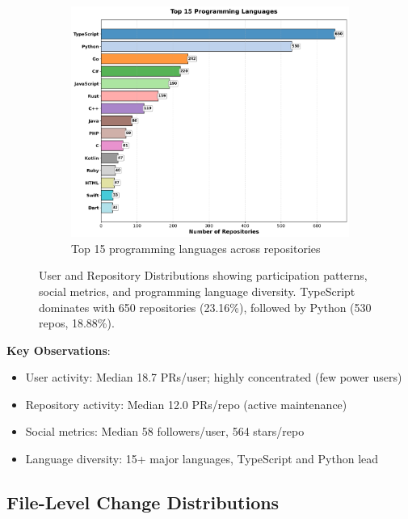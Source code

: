 \documentclass[11pt]{article}
\begin{document}
\begin{figure}[H]
\begin{subfigure}[b]{0.9\textwidth}
\centering
\includegraphics[width=\textwidth]{figures_individual/24_programming_languages_barplot.png}
\caption{Top 15 programming languages across repositories}
\label{fig:languages}
\end{subfigure}

\caption{User and Repository Distributions showing participation patterns, social metrics, and programming language diversity. TypeScript dominates with 650 repositories (23.16\%), followed by Python (530 repos, 18.88\%).}
\label{fig:user_repo_all}
\end{figure}

\textbf{Key Observations}:
\begin{itemize}
    \item User activity: Median 18.7 PRs/user; highly concentrated (few power users)
    \item Repository activity: Median 12.0 PRs/repo (active maintenance)
    \item Social metrics: Median 58 followers/user, 564 stars/repo
    \item Language diversity: 15+ major languages, TypeScript and Python lead
\end{itemize}

\subsection{File-Level Change Distributions}
\end{document}
